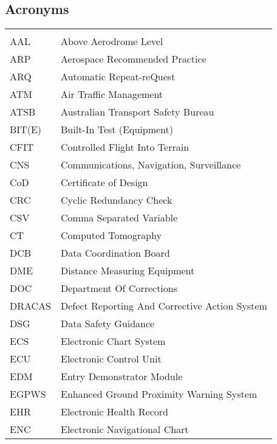 \subsection{Acronyms}
\begin{longtable}{|L{}|L{}|}
  \hline{} & \\\hline
  \endfirsthead
  \hline{} & \\\hline
  \endhead
  \endfoot\endlastfoot

  AAL & Above Aerodrome Level\\\hline
  ARP & Aerospace Recommended Practice\\\hline
  ARQ & Automatic Repeat-reQuest\\\hline
  ATM & Air Traffic Management\\\hline
  ATSB & Australian Transport Safety Bureau\\\hline
  BIT(E) & Built-In Test (Equipment)\\\hline
	CFIT & Controlled Flight Into Terrain\\\hline
  CNS & Communications, Navigation, Surveillance\\\hline
  CoD & Certificate of Design\\\hline
  CRC & Cyclic Redundancy Check\\\hline
  CSV & Comma Separated Variable\\\hline
  CT & Computed Tomography\\\hline
  DCB & Data Coordination Board\\\hline
  DME & Distance Measuring Equipment\\\hline
	DOC & Department Of Corrections\\\hline
  DRACAS & Defect Reporting And Corrective Action System\\\hline
  DSG & Data Safety Guidance\\\hline
  ECS & Electronic Chart System\\\hline
  ECU & Electronic Control Unit\\\hline
	EDM & Entry Demonstrator Module\\\hline
	EGPWS & Enhanced Ground Proximity Warning System\\\hline
  EHR & Electronic Health Record\\\hline
  ENC & Electronic Navigational Chart\\\hline

\end{longtable}
